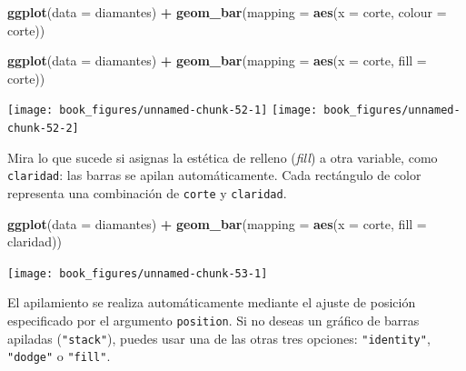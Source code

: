 \documentclass[11pt,oneside]{report}
\newenvironment{Shaded}{\begin{snugshade}}{\end{snugshade}}
\newcommand{\DataTypeTok}[1]{\textcolor[rgb]{0.13,0.29,0.53}{#1}}
\newcommand{\KeywordTok}[1]{\textcolor[rgb]{0.13,0.29,0.53}{\textbf{#1}}}
\newcommand{\NormalTok}[1]{#1}
\newcommand{\OperatorTok}[1]{\textcolor[rgb]{0.81,0.36,0.00}{\textbf{#1}}}
\newcommand{\StringTok}[1]{\textcolor[rgb]{0.31,0.60,0.02}{#1}}
\begin{document}
\begin{Shaded}
\begin{Highlighting}[]
\KeywordTok{ggplot}\NormalTok{(}\DataTypeTok{data =}\NormalTok{ diamantes) }\OperatorTok{+}
\StringTok{  }\KeywordTok{geom_bar}\NormalTok{(}\DataTypeTok{mapping =} \KeywordTok{aes}\NormalTok{(}\DataTypeTok{x =}\NormalTok{ corte, }\DataTypeTok{colour =}\NormalTok{ corte))}

\KeywordTok{ggplot}\NormalTok{(}\DataTypeTok{data =}\NormalTok{ diamantes) }\OperatorTok{+}
\StringTok{  }\KeywordTok{geom_bar}\NormalTok{(}\DataTypeTok{mapping =} \KeywordTok{aes}\NormalTok{(}\DataTypeTok{x =}\NormalTok{ corte, }\DataTypeTok{fill =}\NormalTok{ corte))}
\end{Highlighting}
\end{Shaded}

\texttt{[image: book\_figures/unnamed-chunk-52-1]}
\texttt{[image: book\_figures/unnamed-chunk-52-2]}

Mira lo que sucede si asignas la estética de relleno (\emph{fill}) a
otra variable, como \texttt{claridad}: las barras se apilan
automáticamente. Cada rectángulo de color representa una combinación de
\texttt{corte} y \texttt{claridad}.

\begin{Shaded}
\begin{Highlighting}[]
\KeywordTok{ggplot}\NormalTok{(}\DataTypeTok{data =}\NormalTok{ diamantes) }\OperatorTok{+}
\StringTok{  }\KeywordTok{geom_bar}\NormalTok{(}\DataTypeTok{mapping =} \KeywordTok{aes}\NormalTok{(}\DataTypeTok{x =}\NormalTok{ corte, }\DataTypeTok{fill =}\NormalTok{ claridad))}
\end{Highlighting}
\end{Shaded}

\begin{center}\texttt{[image: book\_figures/unnamed-chunk-53-1]} \end{center}

El apilamiento se realiza automáticamente mediante el ajuste de posición
especificado por el argumento \texttt{position}. Si no deseas un gráfico
de barras apiladas (\texttt{"stack"}), puedes usar una de las otras tres
opciones: \texttt{"identity"}, \texttt{"dodge"} o \texttt{"fill"}.
\end{document}
